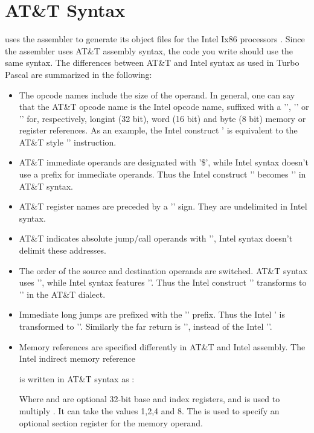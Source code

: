 \documentclass{report}
\begin{document}
\section{AT\&T Syntax}
\label{se:AttSyntax}
\fpc uses the \gnu {} assembler to generate its object files for
the Intel Ix86 processors . Since
the \gnu assembler uses AT\&T assembly syntax, the code you write should
use the same syntax. The differences between AT\&T and Intel syntax as used
in Turbo Pascal are summarized in the following:
\begin{itemize}
\item The opcode names include the size of the operand. In general, one can
say that the AT\&T opcode name is the Intel opcode name, suffixed with a
'', '' or '' for, respectively, longint (32 bit),
word (16 bit) and byte (8 bit) memory or register references. As an example,
the Intel construct \mbox{'} is equivalent to the AT\&T style '' instruction.
\item AT\&T immediate operands are designated with '\$', while Intel syntax
doesn't use a prefix for immediate operands. Thus the Intel construct
'' becomes '' in AT\&T syntax.
\item AT\&T register names are preceded by a '\var{\%}' sign.
They are undelimited in Intel syntax.
\item AT\&T indicates absolute jump/call operands with '\var{*}', Intel
syntax doesn't delimit these addresses.
\item The order of the source and destination operands are switched. AT\&T
syntax uses '', while Intel syntax features ''. Thus the Intel construct '' transforms to
'' in the AT\&T dialect.
\item Immediate long jumps are prefixed with the '' prefix. Thus the
Intel ' is transformed to ''. Similarly the far return is '', instead of the
Intel ''.
\item Memory references are specified differently in AT\&T and Intel
assembly. The Intel indirect memory reference
\begin{quote}
\end{quote}
is written in AT\&T syntax as :
\begin{quote}
\end{quote}
Where  and  are optional 32-bit base and index
registers, and  is used to multiply . It can take the
values 1,2,4 and 8. The  is used to specify an optional section
register for the memory operand.
\end{itemize}
\end{document}
